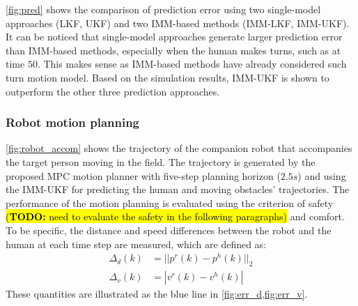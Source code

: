 \documentclass[letterpaper, 10 pt, conference]{ieeeconf}
\newcommand{\todohere}[1]{\hl{(\textbf{TODO:} #1)}}
\begin{document}
	\cref{fig:pred} shows the comparison of prediction error using two single-model approaches (LKF, UKF) and two IMM-based methods (IMM-LKF, IMM-UKF).
	It can be noticed that single-model approaches generate larger prediction error than IMM-based methods, especially when the human makes turns,  such as at time $50$.
	This makes sense as IMM-based methods have already considered such turn motion model.
	Based on the simulation results, IMM-UKF is shown to outperform the other three prediction approaches.
	
	\subsubsection{Robot motion planning}\label{subsubsec:motion_plan}
	\cref{fig:robot_accom} shows the trajectory of the companion robot that accompanies the target person moving in the field. The trajectory is generated by the proposed MPC motion planner with five-step planning horizon ($2.5s$) and using the IMM-UKF for predicting the human and moving obstacles' trajectories.
	The performance of the motion planning is evaluated using the criterion of safety \todohere{need to evaluate the safety in the following paragraphs} and comfort.
	To be specific, the distance and speed differences between the robot and the human at each time step are measured, which are defined as:
	\begin{subequations}
		\begin{align}
			\Delta_d(k)&=||p^r(k)-p^h(k)||_2\label{eqn:err_d}\\
			\Delta_v(k)&=|v^r(k)-v^h(k)|\label{eqn:err_v}
		\end{align}
	\end{subequations}
	These quantities are illustrated as the blue line in \cref{fig:err_d,fig:err_v}.
	
\end{document}
